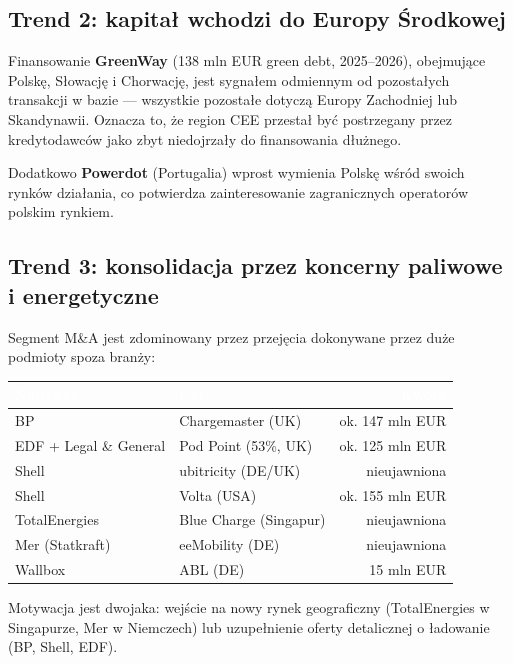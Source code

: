 \documentclass[11pt,a4paper]{article}
\begin{document}
	\subsection{Trend 2: kapitał wchodzi do Europy Środkowej}
	
	Finansowanie \textbf{GreenWay} (138 mln EUR green debt, 2025--2026),
	obejmujące Polskę, Słowację i Chorwację, jest sygnałem odmiennym od
	pozostałych transakcji w bazie --- wszystkie pozostałe dotyczą Europy
	Zachodniej lub Skandynawii. Oznacza to, że region CEE przestał być
	postrzegany przez kredytodawców jako zbyt niedojrzały do finansowania
	dłużnego.
	
	Dodatkowo \textbf{Powerdot} (Portugalia) wprost wymienia Polskę wśród
	swoich rynków działania, co potwierdza zainteresowanie zagranicznych
	operatorów polskim rynkiem.
	
	\subsection{Trend 3: konsolidacja przez koncerny paliwowe i energetyczne}
	
	Segment M\&A jest zdominowany przez przejęcia dokonywane przez duże
	podmioty spoza branży:
	
	\begin{center}
		\begin{tabular}{llr}
			\toprule
			\rowcolor{granatowy}
			\textcolor{white}{\textbf{Nabywca}} & \textcolor{white}{\textbf{Cel}} & \textcolor{white}{\textbf{Kwota}} \\
			\midrule
			BP & Chargemaster (UK) & ok. 147 mln EUR \\
			EDF + Legal \& General & Pod Point (53\%, UK) & ok. 125 mln EUR \\
			Shell & ubitricity (DE/UK) & nieujawniona \\
			Shell & Volta (USA) & ok. 155 mln EUR \\
			TotalEnergies & Blue Charge (Singapur) & nieujawniona \\
			Mer (Statkraft) & eeMobility (DE) & nieujawniona \\
			Wallbox & ABL (DE) & 15 mln EUR \\
			\bottomrule
		\end{tabular}
	\end{center}
	
	Motywacja jest dwojaka: wejście na nowy rynek geograficzny (TotalEnergies
	w Singapurze, Mer w Niemczech) lub uzupełnienie oferty detalicznej
	o ładowanie (BP, Shell, EDF).
	
\end{document}
